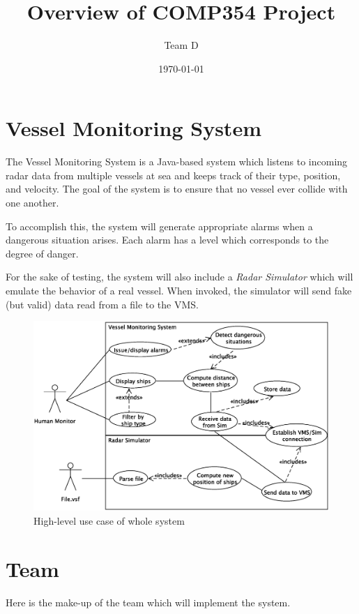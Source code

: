 \documentclass{article}
\begin{document}
\title{Overview of COMP354 Project}
\author{Team D}
\date{\today}

\maketitle

\section{Vessel Monitoring System}
The Vessel Monitoring System is a Java-based system which listens to incoming radar data from multiple vessels at sea and keeps track of their type, position, and velocity. The goal of the system is to ensure that no vessel ever collide with one another.

To accomplish this, the system will generate appropriate alarms when a dangerous situation arises. Each alarm has a level which corresponds to the degree of danger.

For the sake of testing, the system will also include a \emph{Radar Simulator} which will emulate the behavior of a real vessel. When invoked, the simulator will send fake (but valid) data read from a file to the VMS.

\begin{figure}[h]
\caption{High-level use case of whole system}
\includegraphics[width=\linewidth]{usecase.eps}
\end{figure}

\section{Team}
Here is the make-up of the team which will implement the system.
\end{document}
